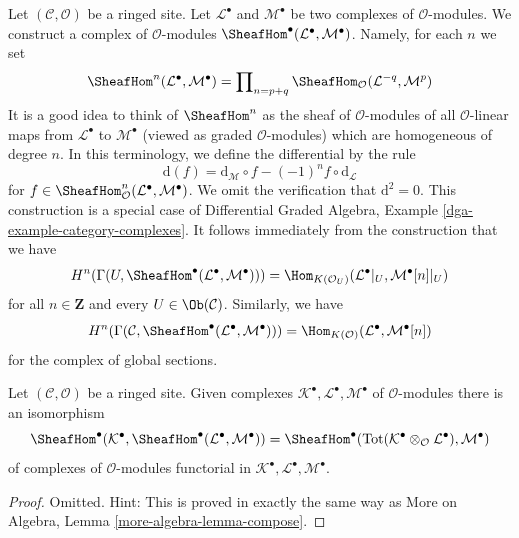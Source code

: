 \noindent
Let $(\mathcal{C}, \mathcal{O})$ be a ringed site. Let
$\mathcal{L}^\bullet$ and $\mathcal{M}^\bullet$ be two complexes
of $\mathcal{O}$-modules. We construct a complex
of $\mathcal{O}$-modules
$\SheafHom^\bullet(\mathcal{L}^\bullet, \mathcal{M}^\bullet)$.
Namely, for each $n$ we set
$$
\SheafHom^n(\mathcal{L}^\bullet, \mathcal{M}^\bullet) =
\prod\nolimits_{n = p + q}
\SheafHom_\mathcal{O}(\mathcal{L}^{-q}, \mathcal{M}^p)
$$
It is a good idea to think of $\SheafHom^n$ as the
sheaf of $\mathcal{O}$-modules of all $\mathcal{O}$-linear
maps from $\mathcal{L}^\bullet$ to $\mathcal{M}^\bullet$
(viewed as graded $\mathcal{O}$-modules) which are homogeneous
of degree $n$. In this terminology, we define the differential by the rule
$$
\text{d}(f) =
\text{d}_\mathcal{M} \circ f - (-1)^n f \circ \text{d}_\mathcal{L}
$$
for
$f \in \SheafHom^n_\mathcal{O}(\mathcal{L}^\bullet, \mathcal{M}^\bullet)$.
We omit the verification that $\text{d}^2 = 0$.
This construction is a special case of
Differential Graded Algebra, Example \ref{dga-example-category-complexes}.
It follows immediately from the construction that we have
\begin{equation}
\label{equation-cohomology-hom-complex}
H^n(\Gamma(U, \SheafHom^\bullet(\mathcal{L}^\bullet, \mathcal{M}^\bullet))) =
\Hom_{K(\mathcal{O}_U)}(\mathcal{L}^\bullet|_U, \mathcal{M}^\bullet[n]|_U)
\end{equation}
for all $n \in \mathbf{Z}$ and every $U \in \Ob(\mathcal{C})$. Similarly,
we have
\begin{equation}
\label{equation-global-cohomology-hom-complex}
H^n(\Gamma(\mathcal{C},
\SheafHom^\bullet(\mathcal{L}^\bullet, \mathcal{M}^\bullet))) =
\Hom_{K(\mathcal{O})}(\mathcal{L}^\bullet, \mathcal{M}^\bullet[n])
\end{equation}
for the complex of global sections.

\begin{lemma}
\label{lemma-compose}
Let $(\mathcal{C}, \mathcal{O})$ be a ringed site.
Given complexes $\mathcal{K}^\bullet, \mathcal{L}^\bullet, \mathcal{M}^\bullet$
of $\mathcal{O}$-modules there is an isomorphism
$$
\SheafHom^\bullet(\mathcal{K}^\bullet,
\SheafHom^\bullet(\mathcal{L}^\bullet, \mathcal{M}^\bullet))
=
\SheafHom^\bullet(\text{Tot}(\mathcal{K}^\bullet \otimes_\mathcal{O}
\mathcal{L}^\bullet), \mathcal{M}^\bullet)
$$
of complexes of $\mathcal{O}$-modules functorial in
$\mathcal{K}^\bullet, \mathcal{L}^\bullet, \mathcal{M}^\bullet$.
\end{lemma}

\begin{proof}
Omitted. Hint: This is proved in exactly the same way as
More on Algebra, Lemma \ref{more-algebra-lemma-compose}.
\end{proof}

